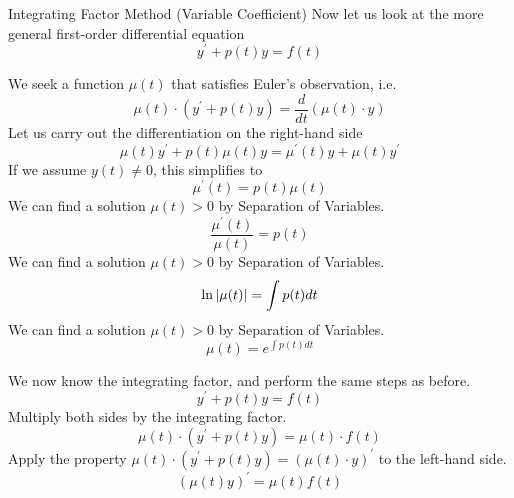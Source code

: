 \documentclass{beamer}
\begin{document}
\begin{frame}
\begin{block}{Integrating Factor Method (Variable Coefficient)}
Now let us look at the more general first-order differential equation
\begin{equation*}
y^\prime + p(t) y = f(t)
\end{equation*}
\begin{overprint}
We seek a function $\mu(t)$ that satisfies Euler's observation, i.e.
\begin{equation*}
\mu(t)\cdot\left(y^\prime + p(t) y\right) = \dfrac{d}{dt}\left(\mu(t)\cdot y\right)
\end{equation*}
Let us carry out the differentiation on the right-hand side
\begin{equation*}
\mu(t) y^\prime + p(t)\mu(t) y = \mu^\prime (t) y + \mu(t) y^\prime
\end{equation*}
If we assume $y(t)\neq 0$, this simplifies to
\begin{equation*}
\mu^\prime (t) = p(t)\mu(t)
\end{equation*}
We can find a solution $\mu(t)>0$ by Separation of Variables.
\begin{equation*}
\dfrac{\mu^\prime (t)}{\mu(t)} = p(t)
\end{equation*}
We can find a solution $\mu(t)>0$ by Separation of Variables.
\begin{equation*}
\ln\abs{\mu(t)} = \int p(t) dt
\end{equation*}
We can find a solution $\mu(t)>0$ by Separation of Variables.
\begin{equation*}
\mu(t) = e^{\int p(t) dt}
\end{equation*}
\end{overprint}
\begin{overprint}
We now know the integrating factor, and perform the same steps as before.
\begin{equation*}
y^\prime + p(t) y = f(t)
\end{equation*}
Multiply both sides by the integrating factor.
\begin{equation*}
\mu(t)\cdot\left(y^\prime + p(t) y\right) = \mu(t)\cdot f(t)
\end{equation*}
Apply the property $\mu(t)\cdot\left(y^\prime + p(t) y\right) = {\left(\mu(t)\cdot y\right)}^\prime$ to the left-hand side.
\begin{equation*}
{\left(\mu(t) y\right)}^\prime = \mu(t) f(t)

\end{equation*}
\end{overprint}
\end{block}
\end{frame}
\end{document}
